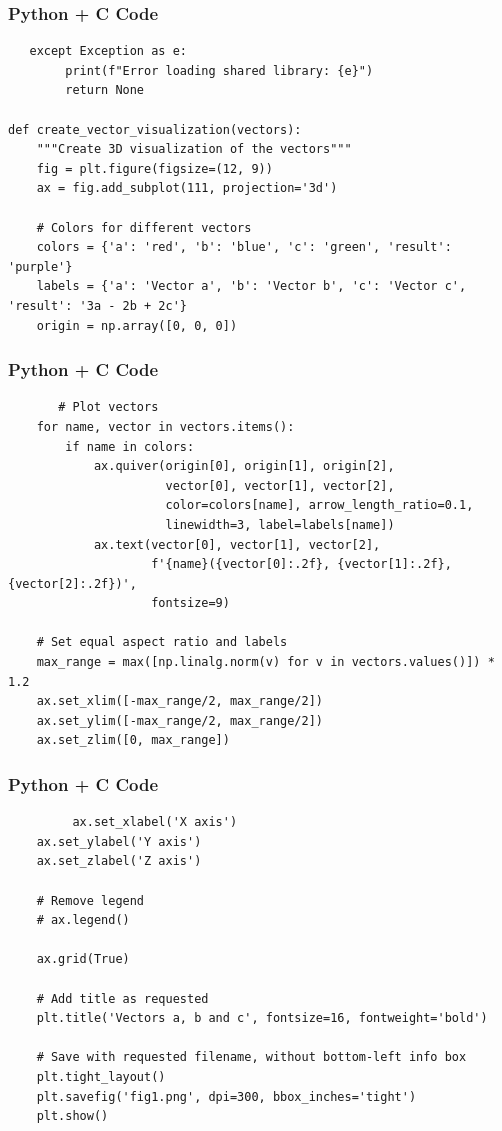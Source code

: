 \documentclass{beamer}
\begin{document}
\begin{frame}[fragile]
    \frametitle{Python + C Code}
    \begin{lstlisting}
   except Exception as e:
        print(f"Error loading shared library: {e}")
        return None

def create_vector_visualization(vectors):
    """Create 3D visualization of the vectors"""
    fig = plt.figure(figsize=(12, 9))
    ax = fig.add_subplot(111, projection='3d')

    # Colors for different vectors
    colors = {'a': 'red', 'b': 'blue', 'c': 'green', 'result': 'purple'}
    labels = {'a': 'Vector a', 'b': 'Vector b', 'c': 'Vector c', 'result': '3a - 2b + 2c'}
    origin = np.array([0, 0, 0])
    \end{lstlisting}
\end{frame}

\begin{frame}[fragile]
    \frametitle{Python + C Code}
    \begin{lstlisting}
       # Plot vectors
    for name, vector in vectors.items():
        if name in colors:
            ax.quiver(origin[0], origin[1], origin[2],
                      vector[0], vector[1], vector[2],
                      color=colors[name], arrow_length_ratio=0.1,
                      linewidth=3, label=labels[name])
            ax.text(vector[0], vector[1], vector[2],
                    f'{name}({vector[0]:.2f}, {vector[1]:.2f}, {vector[2]:.2f})',
                    fontsize=9)

    # Set equal aspect ratio and labels
    max_range = max([np.linalg.norm(v) for v in vectors.values()]) * 1.2
    ax.set_xlim([-max_range/2, max_range/2])
    ax.set_ylim([-max_range/2, max_range/2])
    ax.set_zlim([0, max_range])
    \end{lstlisting}
\end{frame}

\begin{frame}[fragile]
    \frametitle{Python + C Code}
    \begin{lstlisting}
         ax.set_xlabel('X axis')
    ax.set_ylabel('Y axis')
    ax.set_zlabel('Z axis')

    # Remove legend
    # ax.legend()

    ax.grid(True)

    # Add title as requested
    plt.title('Vectors a, b and c', fontsize=16, fontweight='bold')

    # Save with requested filename, without bottom-left info box
    plt.tight_layout()
    plt.savefig('fig1.png', dpi=300, bbox_inches='tight')
    plt.show()
    \end{lstlisting}
\end{frame}
\end{document}
